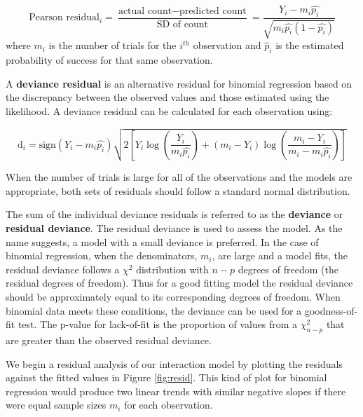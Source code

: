\documentclass[
]{krantz}
\begin{document}
\begin{equation*}
\textrm{Pearson residual}_i = \frac{\textrm{actual count}-\textrm{predicted count}}{\textrm{SD of count}} =
\frac{Y_i-m_i\hat{p_i}}{\sqrt{m_i\hat{p_i}(1-\hat{p_i})}}
\end{equation*}
where \(m_i\) is the number of trials for the \(i^{th}\) observation and \(\hat{p}_i\) is the estimated probability of success for that same observation.

A \textbf{deviance residual}  is an alternative residual for binomial regression based on the discrepancy between the observed values and those estimated using the likelihood.
A deviance residual can be calculated for each observation using:

\begin{equation*}
\textrm{d}_i = 
\textrm{sign}(Y_i-m_i\hat{p_i})\sqrt{2[Y_i \log\left(\frac{Y_i}{m_i \hat{p_i}}\right)+
(m_i - Y_i) \log\left(\frac{m_i - Y_i}{m_i - m_i \hat{p_i}}\right)]}
\end{equation*}

When the number of trials is large for all of the observations and the models are appropriate, both sets of residuals should follow a standard normal distribution.

The sum of the individual deviance residuals is referred to as the \textbf{deviance} or \textbf{residual deviance}.  The residual deviance is used to assess the model. As the name suggests, a model with a small deviance is preferred. In the case of binomial regression, when the denominators, \(m_i\), are large and a model fits, the residual deviance follows a \(\chi^2\) distribution with \(n-p\) degrees of freedom (the residual degrees of freedom). Thus for a good fitting model the residual deviance should be approximately equal to its corresponding degrees of freedom. When binomial data meets these conditions, the deviance can be used for a goodness-of-fit test. The p-value for lack-of-fit is the proportion of values from a \(\chi_{n-p}^2\) that are greater than the observed residual deviance.

We begin a residual analysis of our interaction model by plotting the residuals against the fitted values in Figure \ref{fig:resid}. This kind of plot for binomial regression would produce two linear trends with similar negative slopes if there were equal sample sizes \(m_i\) for each observation.
\end{document}
